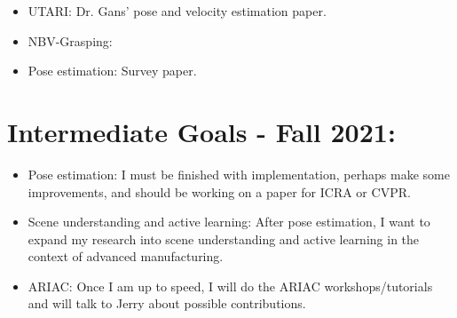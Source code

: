 \documentclass[11pt]{article}
\begin{document}
\begin{itemize}
      \item UTARI: Dr. Gans' pose and velocity estimation paper.
      \item NBV-Grasping:
      \item Pose estimation: Survey paper.
\end{itemize}

\section{Intermediate Goals - Fall 2021:}
\begin{itemize}
      \item Pose estimation: I must be finished with implementation, perhaps make some improvements, and should be working on a paper for ICRA or CVPR.
      \item Scene understanding and active learning: After pose estimation, I want to expand my research into scene understanding and active learning in the context of advanced manufacturing.
      \item ARIAC: Once I am up to speed, I will do the ARIAC workshops/tutorials and will talk to Jerry about possible contributions.
\end{itemize}


\newpage


\end{document}
